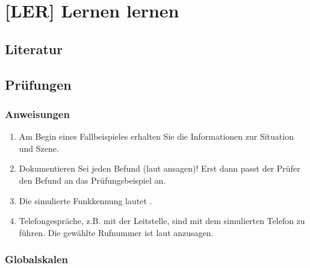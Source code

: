 \chapter{[LER] Lernen lernen}

\section{Literatur}

\section{Prüfungen}

\subsection{Anweisungen}

\begin{enumerate}
  \item Am Begin eines Fallbeispieles erhalten Sie die Informationen zur
  Situation und Szene.
  \item Dokumentieren Sei jeden Befund (laut ansagen)! Erst dann passt der
  Prüfer den Befund an das Prüfungsbeispiel an.
  \item Die simulierte Funkkennung lautet \TakeNotesMedium . 
  \item Telefongespräche, z.B. mit der Leitstelle, sind mit dem simulierten
  Telefon zu führen. Die gewählte Rufnummer ist laut anzusagen.
\end{enumerate}

\subsection{Globalskalen}

